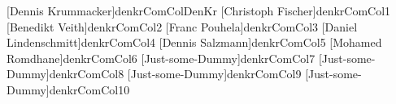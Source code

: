 [Dennis Krummacker]{denkrComColDenKr}%
\newcommand{\dkc}[1]{\dekr{#1}}
%
[Christoph Fischer]{denkrComCol1}%
%
[Benedikt Veith]{denkrComCol2}%
%
[Franc Pouhela]{denkrComCol3}%
%
[Daniel Lindenschmitt]{denkrComCol4}%
%
[Dennis Salzmann]{denkrComCol5}%
%
[Mohamed Romdhane]{denkrComCol6}%
%
[Just-some-Dummy]{denkrComCol7}%
%
[Just-some-Dummy]{denkrComCol8}%
%
[Just-some-Dummy]{denkrComCol9}%
%
[Just-some-Dummy]{denkrComCol10}%
%
%
%
%
%
%
%
